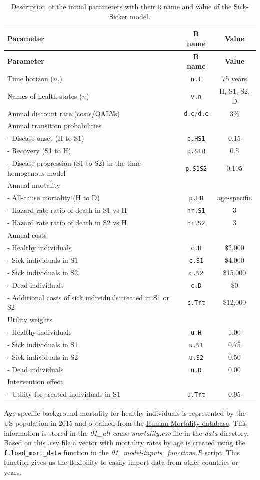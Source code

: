 \documentclass[]{article}
\begin{document}
\begin{longtable}[]{@{}lcc@{}}
\caption{\label{tab:parameters} Description of the initial parameters
with their \texttt{R} name and value of the Sick-Sicker
model.}\tabularnewline
\toprule
\textbf{Parameter} & \textbf{R name} & \textbf{Value}\tabularnewline
\midrule
\endfirsthead
\toprule
\textbf{Parameter} & \textbf{R name} & \textbf{Value}\tabularnewline
\midrule
\endhead
Time horizon (\(n_t\)) & \texttt{n.t} & 75 years\tabularnewline
Names of health states (\(n\)) & \texttt{v.n} & H, S1, S2,
D\tabularnewline
Annual discount rate (costs/QALYs) & \texttt{d.c}/\texttt{d.e} &
3\%\tabularnewline
Annual transition probabilities & &\tabularnewline
- Disease onset (H to S1) & \texttt{p.HS1} & 0.15\tabularnewline
- Recovery (S1 to H) & \texttt{p.S1H} & 0.5\tabularnewline
- Disease progression (S1 to S2) in the time-homogenous model &
\texttt{p.S1S2} & 0.105\tabularnewline
Annual mortality & &\tabularnewline
- All-cause mortality (H to D) & \texttt{p.HD} &
age-specific\tabularnewline
- Hazard rate ratio of death in S1 vs H & \texttt{hr.S1} &
3\tabularnewline
- Hazard rate ratio of death in S2 vs H & \texttt{hr.S2} &
3\tabularnewline
Annual costs & &\tabularnewline
- Healthy individuals & \texttt{c.H} & \$2,000\tabularnewline
- Sick individuals in S1 & \texttt{c.S1} & \$4,000\tabularnewline
- Sick individuals in S2 & \texttt{c.S2} & \$15,000\tabularnewline
- Dead individuals & \texttt{c.D} & \$0\tabularnewline
- Additional costs of sick individuals treated in S1 or S2 &
\texttt{c.Trt} & \$12,000\tabularnewline
Utility weights & &\tabularnewline
- Healthy individuals & \texttt{u.H} & 1.00\tabularnewline
- Sick individuals in S1 & \texttt{u.S1} & 0.75\tabularnewline
- Sick individuals in S2 & \texttt{u.S2} & 0.50\tabularnewline
- Dead individuals & \texttt{u.D} & 0.00\tabularnewline
Intervention effect & &\tabularnewline
- Utility for treated individuals in S1 & \texttt{u.Trt} &
0.95\tabularnewline
\bottomrule
\end{longtable}

Age-specific background mortality for healthy individuals is represented
by the US population in 2015 and obtained from the
\href{https://www.mortality.org}{Human Mortality database}. This
information is stored in the \emph{01\_all-cause-mortality.csv} file in
the \emph{data} directory. Based on this .csv file a vector with
mortality rates by age is created using the \texttt{f.load\_mort\_data}
function in the \emph{01\_model-inputs\_functions.R} script. This
function gives us the flexibility to easily import data from other
countries or years.
\end{document}
